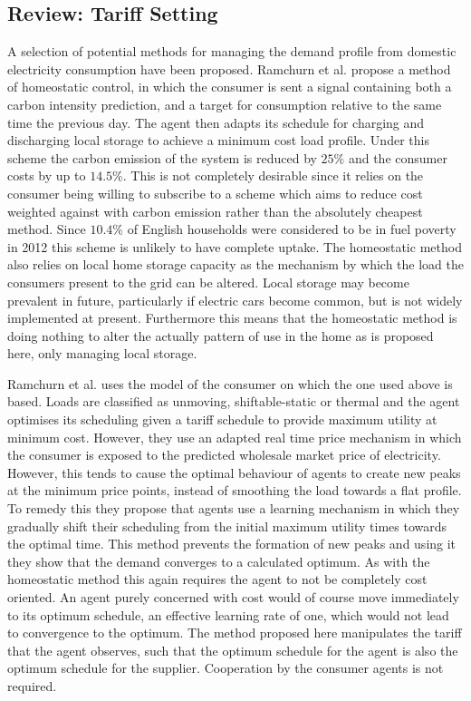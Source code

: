 \documentclass[a4paper, 10 pt, conference]{ieeeconf}  %
\begin{document}
\subsection{Review: Tariff Setting}
\label{reviewtariffset}
A selection of potential methods for managing the demand profile from domestic electricity consumption have been proposed. Ramchurn et al. \cite{ramchurn2011agenthomeo} propose a method of homeostatic control, in which the consumer is sent a signal containing both a carbon intensity prediction, and a target for consumption relative to the same time the previous day. The agent then adapts its schedule for charging and discharging local storage to achieve a minimum cost load profile. Under this scheme the carbon emission of the system is reduced by $25\%$ and the consumer costs by up to $14.5\%$. This is not completely desirable since it relies on the consumer being willing to subscribe to a scheme which aims to reduce cost weighted against with carbon emission rather than the absolutely cheapest method. Since $10.4\%$ of English households were considered to be in fuel poverty in 2012 \cite{govfuelpov} this scheme is unlikely to have complete uptake. The homeostatic method also relies on local home storage capacity as the mechanism by which the load the consumers present to the grid can be altered. Local storage may become prevalent in future, particularly if electric cars become common, but is not widely implemented at present. Furthermore this means that the homeostatic method is doing nothing to alter the actually pattern of use in the home as is proposed here, only managing local storage.

Ramchurn et al. \cite{ramchurn2011agent} uses the model of the consumer on which the one used above is based. Loads are classified as unmoving, shiftable-static or thermal and the agent optimises its scheduling given a tariff schedule to provide maximum utility at minimum cost. However, they use an adapted real time price mechanism in which the consumer is exposed to the predicted wholesale market price of electricity. However, this tends to cause the optimal behaviour of agents to create new peaks at the minimum price points, instead of smoothing the load towards a flat profile. To remedy this they propose that agents use a learning mechanism in which they gradually shift their scheduling from the initial maximum utility times towards the optimal time. This method prevents the formation of new peaks and using it they show that the demand converges to a calculated optimum. As with the homeostatic method this again requires the agent to not be completely cost oriented. An agent purely concerned with cost would of course move immediately to its optimum schedule, an effective learning rate of one, which would not lead to convergence to the optimum. The method proposed here manipulates the tariff that the agent observes, such that the optimum schedule for the agent is also the optimum schedule for the supplier. Cooperation by the consumer agents is not required.
\end{document}
